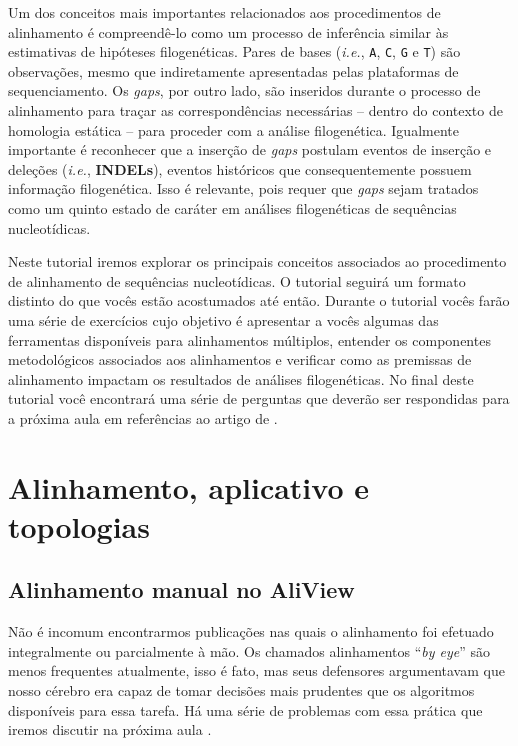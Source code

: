 \begin{refsection}
Um dos conceitos mais importantes relacionados aos procedimentos de alinhamento é compreendê-lo como um processo de inferência similar às estimativas de hipóteses filogenéticas. Pares de bases (\textit{i.e.}, \texttt{A}, \texttt{C}, \texttt{G} e \texttt{T}) são observações, mesmo que indiretamente apresentadas pelas plataformas de sequenciamento. Os \textit{gaps}, por outro lado, são inseridos durante o processo de alinhamento para traçar as correspondências necessárias -- dentro do contexto de homologia estática \parencite{Wheeler_2001} -- para proceder com a análise filogenética. Igualmente importante é reconhecer que a inserção de \textit{gaps} postulam eventos de inserção e deleções (\textit{i.e.}, \textbf{INDELs}), eventos históricos que consequentemente possuem informação filogenética. Isso é relevante, pois requer que \textit{gaps} sejam tratados como um quinto estado de caráter em análises filogenéticas de sequências nucleotídicas.

Neste tutorial iremos explorar os principais conceitos associados ao procedimento de alinhamento de sequências nucleotídicas. O tutorial seguirá um formato distinto do que vocês estão acostumados até então. Durante o tutorial vocês farão uma série de exercícios cujo objetivo é apresentar a vocês algumas das ferramentas disponíveis para alinhamentos múltiplos, entender os componentes metodológicos associados aos alinhamentos e verificar como as premissas de alinhamento impactam os resultados de análises filogenéticas. No final deste tutorial você encontrará uma série de perguntas que deverão ser respondidas para a próxima aula em referências ao artigo de \textcite{Phillips_et_al_2000}.


\section{Alinhamento, aplicativo e topologias}\label{tut8:msa}

\subsection{Alinhamento manual no AliView}\label{tut8:msa:man}

Não é incomum encontrarmos publicações nas quais o alinhamento foi efetuado integralmente ou parcialmente à mão. Os chamados alinhamentos ``\textit{by eye}'' são menos frequentes atualmente, isso é fato, mas seus defensores argumentavam que nosso cérebro era capaz de tomar decisões mais prudentes que os algoritmos disponíveis para essa tarefa. Há uma série de problemas com essa prática que iremos discutir na próxima aula \parencite[veja ][]{Phillips_et_al_2000}. \\



\end{refsection}
